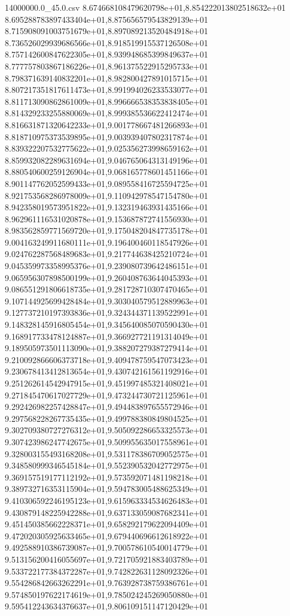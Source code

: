 \begin{filecontents*}{14000000.0_45.0.csv}
8.674668108479620798e+01,8.854222013802518632e+01
8.695288783897433404e+01,8.875656579543829139e+01
8.715908091003751679e+01,8.897089213520484918e+01
8.736526029939686566e+01,8.918519915537126508e+01
8.757142600847622305e+01,8.939948685399849637e+01
8.777757803867186226e+01,8.961375522915295733e+01
8.798371639140832201e+01,8.982800427891015715e+01
8.807217351817611473e+01,8.991994026233533077e+01
8.811713090862861009e+01,8.996666538353838405e+01
8.814329233255880069e+01,8.999385536622412474e+01
8.816631871320642233e+01,9.001778667481266893e+01
8.818710975373539895e+01,9.003939407802317874e+01
8.839322207532775622e+01,9.025356273998659162e+01
8.859932082289631694e+01,9.046765064313149196e+01
8.880540600259126904e+01,9.068165778601451166e+01
8.901147762052599433e+01,9.089558416725594725e+01
8.921753568286978009e+01,9.110942978547154780e+01
8.942358019573951822e+01,9.132319463931435166e+01
8.962961116531020878e+01,9.153687872741556930e+01
8.983562859771569720e+01,9.175048204847735178e+01
9.004163249911680111e+01,9.196400460118547926e+01
9.024762287568489683e+01,9.217744638425210724e+01
9.045359973358995376e+01,9.239080739642486151e+01
9.065956307898500199e+01,9.260408763644045393e+01
9.086551291806618735e+01,9.281728710307470465e+01
9.107144925699428484e+01,9.303040579512889963e+01
9.127737210197393836e+01,9.324344371139522991e+01
9.148328145916805454e+01,9.345640085070590430e+01
9.168917733478124887e+01,9.366927721191314049e+01
9.189505973501113090e+01,9.388207279387279414e+01
9.210092866606373718e+01,9.409478759547073423e+01
9.230678413412813654e+01,9.430742161561192916e+01
9.251262614542947915e+01,9.451997485321408021e+01
9.271845470617027729e+01,9.473244730721125961e+01
9.292426982257428847e+01,9.494483897655572946e+01
9.297568228267735435e+01,9.499788380849804525e+01
9.302709380727276312e+01,9.505092286653325573e+01
9.307423986247742675e+01,9.509955635017558961e+01
9.328003155493168208e+01,9.531178386709052575e+01
9.348580999346545184e+01,9.552390532042772975e+01
9.369157519177112192e+01,9.573592071481198218e+01
9.389732716353115904e+01,9.594783005488625349e+01
9.410306592246195123e+01,9.615963334534626483e+01
9.430879148225942288e+01,9.637133059087682341e+01
9.451450385662228371e+01,9.658292179622094409e+01
9.472020305925633465e+01,9.679440696612618922e+01
9.492588910386739087e+01,9.700578610540014779e+01
9.513156200416055697e+01,9.721705921883403789e+01
9.533722177384372287e+01,9.742822631128092326e+01
9.554286842663262291e+01,9.763928738759386761e+01
9.574850197622174619e+01,9.785024245269050880e+01
9.595412243634376637e+01,9.806109151147120429e+01

\end{filecontents*}
